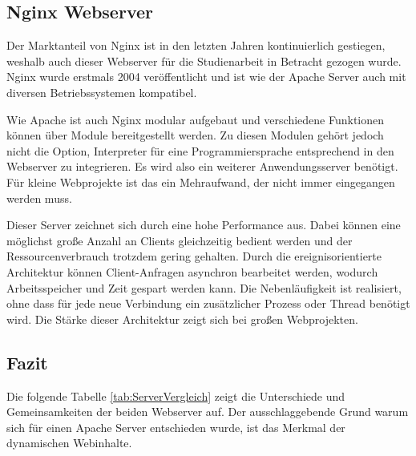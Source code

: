 \subsection{Nginx Webserver}
Der Marktanteil von Nginx ist in den letzten Jahren kontinuierlich gestiegen, weshalb auch dieser Webserver für die Studienarbeit in Betracht gezogen wurde. Nginx wurde erstmals 2004 veröffentlicht und ist wie der Apache Server auch mit diversen Betriebssystemen kompatibel.

Wie Apache ist auch Nginx modular aufgebaut und verschiedene Funktionen können über Module bereitgestellt werden. Zu diesen Modulen gehört jedoch nicht die Option, Interpreter für eine Programmiersprache entsprechend in den Webserver zu integrieren. Es wird also ein weiterer Anwendungsserver benötigt. Für kleine Webprojekte ist das ein Mehraufwand, der nicht immer eingegangen werden muss. 

Dieser Server zeichnet sich durch eine hohe Performance aus. Dabei können eine möglichst große Anzahl an Clients gleichzeitig bedient werden und der Ressourcenverbrauch trotzdem gering gehalten. Durch die ereignisorientierte Architektur können Client-Anfragen asynchron bearbeitet werden, wodurch Arbeitsspeicher und Zeit gespart werden kann. Die Nebenläufigkeit ist realisiert, ohne dass für jede neue Verbindung ein zusätzlicher Prozess oder Thread benötigt wird. Die Stärke dieser Architektur zeigt sich bei großen Webprojekten. 


\subsection{Fazit}
Die folgende Tabelle \ref{tab:ServerVergleich} zeigt die Unterschiede und Gemeinsamkeiten der beiden Webserver auf. Der ausschlaggebende Grund warum sich für einen Apache Server entschieden wurde, ist das Merkmal der dynamischen Webinhalte.

